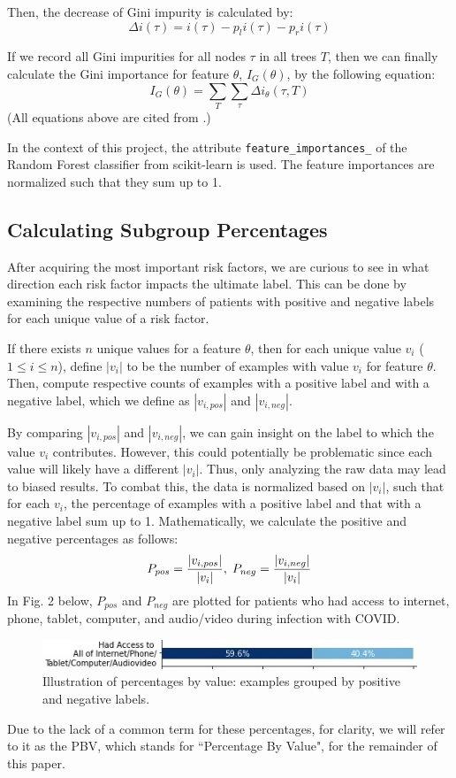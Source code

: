 \documentclass{article}
\begin{document}
Then, the decrease of Gini impurity is calculated by:
$$\Delta i(\tau) = i(\tau) - p_l i(\tau) - p_r i(\tau)$$

If we record all Gini impurities for all nodes $\tau$ in all trees $T$, then we can finally calculate the Gini importance for feature $\theta$, $I_G(\theta)$, by the following equation:
$$I_G(\theta) = \sum_T \sum_\tau \Delta i_\theta (\tau, T)$$
(All equations above are cited from \citep{Menze2009}.)

In the context of this project, the attribute \texttt{feature\_importances\_} of the Random Forest classifier from scikit-learn is used. The feature importances are normalized such that they sum up to 1.

\subsection{Calculating Subgroup Percentages}
After acquiring the most important risk factors, we are curious to see in what direction each risk factor impacts the ultimate label. This can be done by examining the respective numbers of patients with positive and negative labels for each unique value of a risk factor.

If there exists $n$ unique values for a feature $\theta$, then for each unique value $v_i$ ($1 \leq i \leq n$), define $|v_i|$ to be the number of examples with value $v_i$ for feature $\theta$. Then, compute respective counts of examples with a positive label and with a negative label, which we define as $|v_{i,pos}|$ and $|v_{i,neg}|$. 

By comparing $|v_{i,pos}|$ and $|v_{i,neg}|$, we can gain insight on the label to which the value $v_i$ contributes. However, this could potentially be problematic since each value will likely have a different $|v_i|$. Thus, only analyzing the raw data may lead to biased results. To combat this, the data is normalized based on $|v_i|$, such that for each $v_i$, the percentage of examples with a positive label and that with a negative label sum up to 1. Mathematically, we calculate the positive and negative percentages as follows:
$$P_{pos} = \frac{|v_{i,pos}|}{|v_i|}, \hspace{0.1cm} P_{neg} = \frac{|v_{i,neg}|}{|v_i|}$$
In Fig. 2 below, $P_{pos}$ and $P_{neg}$ are plotted for patients who had access to internet, phone, tablet, computer, and audio/video during infection with COVID.
\begin{figure}[H]
    \center
    \includegraphics[width= \columnwidth]{pbv.jpeg}
    \caption{Illustration of percentages by value: examples grouped by positive and negative labels.}
    \vspace{-4mm}
\end{figure}
Due to the lack of a common term for these percentages, for clarity, we will refer to it as the PBV, which stands for ``Percentage By Value", for the remainder of this paper.
\end{document}
